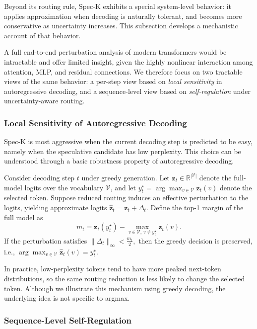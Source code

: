 \documentclass[conference]{IEEEtran}
\theoremstyle{definition} %
\begin{document}
Beyond its routing rule, Spec-K exhibits a special system-level behavior: it applies approximation when decoding is naturally tolerant, and becomes more conservative as uncertainty increases.
This subsection develops a mechanistic account of that behavior.

A full end-to-end perturbation analysis of modern transformers would be intractable and offer limited insight, given the highly nonlinear interaction among attention, MLP, and residual connections.
We therefore focus on two tractable views of the same behavior: a per-step view based on \emph{local sensitivity} in autoregressive decoding, and a sequence-level view based on \emph{self-regulation} under uncertainty-aware routing.

\subsubsection{Local Sensitivity of Autoregressive Decoding}

Spec-K is most aggressive when the current decoding step is predicted to be easy, namely when the speculative candidate has low perplexity.
This choice can be understood through a basic robustness property of autoregressive decoding.

Consider decoding step $t$ under greedy generation.
Let $\mathbf{z}_t \in \mathbb{R}^{|\mathcal{V}|}$ denote the full-model logits over the vocabulary $\mathcal{V}$, and let
$
y_t^\star = \arg\max_{v\in\mathcal{V}} \mathbf{z}_t(v)
$
denote the selected token.
Suppose reduced routing induces an effective perturbation to the logits, yielding approximate logits
$
\hat{\mathbf{z}}_t = \mathbf{z}_t + \Delta_t.
$
Define the top-1 margin of the full model as
\begin{equation}
m_t = \mathbf{z}_t(y_t^\star) - \max_{v\in\mathcal{V},\,v\neq y_t^\star} \mathbf{z}_t(v).
\end{equation}
If the perturbation satisfies
$
\|\Delta_t\|_\infty < \frac{m_t}{2},
$
then the greedy decision is preserved, i.e.,
$
\arg\max_{v\in\mathcal{V}} \hat{\mathbf{z}}_t(v) = y_t^\star.
$

In practice, low-perplexity tokens tend to have more peaked next-token distributions, so the same routing reduction is less likely to change the selected token.
Although we illustrate this mechanism using greedy decoding, the underlying idea is not specific to argmax.

\subsubsection{Sequence-Level Self-Regulation}
\end{document}
